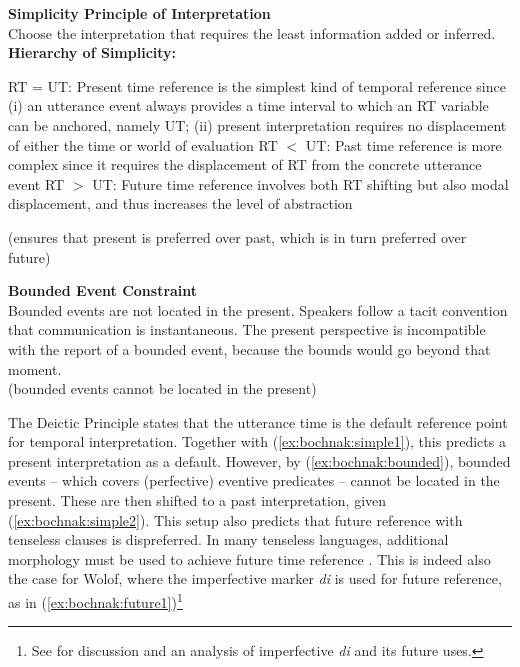 \documentclass[output=paper,newtxmath,modfonts,nonflat,draftmode]{langsci/langscibook}
\begin{document}
\begin{exe}
\ex\label{ex:bochnak:simplicity} \textbf{Simplicity Principle of Interpretation} \\
Choose the interpretation that requires the least information added or
inferred. \smallskip \\
\textbf{Hierarchy of Simplicity:} 
\begin{xlist}
\ex\label{ex:bochnak:simple1} RT = UT: Present time reference is the simplest kind of temporal reference since (i) an utterance event always provides a time interval to which an RT variable can be anchored, namely UT; (ii) present interpretation requires no displacement of either the time or world of evaluation
\ex\label{ex:bochnak:simple2} RT $<$ UT: Past time reference is more complex since it requires the displacement of RT from the concrete utterance event
\ex\label{ex:bochnak:simple3} RT $>$ UT: Future time reference involves both RT shifting but also modal displacement, and thus increases the level of abstraction
\end{xlist}
(ensures that present is preferred over past, which is in turn preferred over future)
\end{exe}

\ea\label{ex:bochnak:bounded} \textbf{Bounded Event Constraint} \\ Bounded events are not located in the present. Speakers follow a tacit convention that communication is instantaneous. The present perspective is incompatible with the report of a bounded event, because the bounds would go beyond that moment. \\
(bounded events cannot be located in the present)
\z

The Deictic Principle states that the utterance time is the default reference point for temporal interpretation. Together with (\ref{ex:bochnak:simple1}), this predicts a present interpretation as a default. However, by (\ref{ex:bochnak:bounded}), bounded events -- which covers (perfective) eventive predicates -- cannot be located in the present. These are then shifted to a past interpretation, given (\ref{ex:bochnak:simple2}). This setup also predicts that future reference with tenseless clauses is dispreferred. In many tenseless languages, additional morphology must be used to achieve future time reference \citep{matthewson06temporal, tonhauser11temporal, bochnak16past}. This is indeed also the case for Wolof, where the imperfective marker \textit{di} is used for future reference, as in (\ref{ex:bochnak:future1})\footnote{See \citealt{bochnak17deriving} for discussion and an analysis of imperfective \textit{di} and its future uses.}
\end{document}
